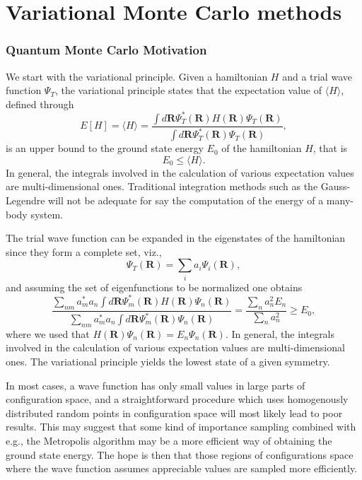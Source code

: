 
\chapter{Variational Monte Carlo methods}

\subsection*{Quantum Monte Carlo Motivation}

We start with the variational principle.
Given a hamiltonian $H$ and a trial wave function $\Psi_T$, the variational principle states that the expectation value of $\langle H \rangle$, defined through 
\[
   E[H]= \langle H \rangle =
   \frac{\int d\bm{R}\Psi^{\ast}_T(\bm{R})H(\bm{R})\Psi_T(\bm{R})}
        {\int d\bm{R}\Psi^{\ast}_T(\bm{R})\Psi_T(\bm{R})},
\]
is an upper bound to the ground state energy $E_0$ of the hamiltonian $H$, that is 
\[
    E_0 \le \langle H \rangle .
\]
In general, the integrals involved in the calculation of various  expectation values  are multi-dimensional ones. Traditional integration methods such as the Gauss-Legendre will not be adequate for say the  computation of the energy of a many-body system.

The trial wave function can be expanded in the eigenstates of the hamiltonian since they form a complete set, viz.,
\[
   \Psi_T(\bm{R})=\sum_i a_i\Psi_i(\bm{R}),
\]
and assuming the set of eigenfunctions to be normalized one obtains 
\[
     \frac{\sum_{nm}a^*_ma_n \int d\bm{R}\Psi^{\ast}_m(\bm{R})H(\bm{R})\Psi_n(\bm{R})}
        {\sum_{nm}a^*_ma_n \int d\bm{R}\Psi^{\ast}_m(\bm{R})\Psi_n(\bm{R})} =\frac{\sum_{n}a^2_n E_n}
        {\sum_{n}a^2_n} \ge E_0,
\]
where we used that $H(\bm{R})\Psi_n(\bm{R})=E_n\Psi_n(\bm{R})$.
In general, the integrals involved in the calculation of various  expectation
values  are multi-dimensional ones. 
The variational principle yields the lowest state of a given symmetry.

In most cases, a wave function has only small values in large parts of 
configuration space, and a straightforward procedure which uses
homogenously distributed random points in configuration space 
will most likely lead to poor results. This may suggest that some kind
of importance sampling combined with e.g., the Metropolis algorithm 
may be  a more efficient way of obtaining the ground state energy.
The hope is then that those regions of configurations space where
the wave function assumes appreciable values are sampled more 
efficiently. 

